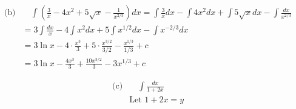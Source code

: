 \documentclass{article}
\begin{document}
\begin{align*}
    \text{(b)} & \quad \int \left( \frac{3}{x} - 4x^2 + 5\sqrt{x} - \frac{1}{x^{2/3}} \right) dx = \int \frac{3}{x} dx - \int 4x^2 dx + \int 5\sqrt{x} dx - \int \frac{dx}{x^{2/3}} \\
    & = 3 \int \frac{dx}{x} - 4 \int x^2 dx + 5 \int x^{1/2} dx - \int x^{-2/3} dx \\
    & = 3 \ln x - 4 \cdot \frac{x^3}{3} + 5 \cdot \frac{x^{3/2}}{3/2} - \frac{x^{1/3}}{1/3} + c \\
    & = 3 \ln x - \frac{4x^3}{3} + \frac{10x^{3/2}}{3} - 3 x^{1/3} + c
\end{align*}

\begin{align*}
    \text{(c)} & \quad \int \frac{dx}{1 + 2x} \\
    & \text{Let } 1 + 2x = y \\
\end{align*}
\end{document}
